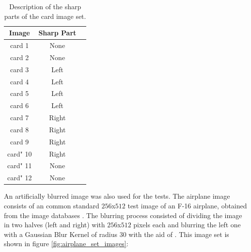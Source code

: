 \begin{table}[htb]
    \centering
    \caption{Description of the sharp parts of the card image set.}\label{tab:card_set_description}
		\begin{center}
        \begin{tabular}
        {|c|c|c|}
        \hline
            Image & Sharp Part
            \\ \hline
            card 1 & None
            \\ \hline
            
            card 2 & None
            \\ \hline
            
            card 3 & Left
            \\ \hline
            
            card 4& Left
            \\ \hline
            
            card 5 & Left
            \\ \hline
            
            card 6 & Left
            \\ \hline
            
            card 7 & Right
            \\ \hline
            
            card 8 & Right
            \\ \hline
            
            card 9 & Right
            \\ \hline
            
            card" 10 & Right
            \\ \hline
            
            card" 11 & None
            \\ \hline

            card" 12 & None
            \\ \hline
            
        \end{tabular}
    \end{center}
    \fautor
\end{table}

An artificially blurred image was also used for the tests. The airplane image consists of an common standard $256$x$512$ test image of an F-16 airplane, obtained from the  image databases \cite{uscsipi1977image}. The blurring process consisted of dividing the image in two halves (left and right) with $256$x$512$ pixels each and blurring the left one with a Gaussian Blur Kernel of radius $30$ with the aid of . This image set is shown in figure \ref{fig:airplane_set_images}:

